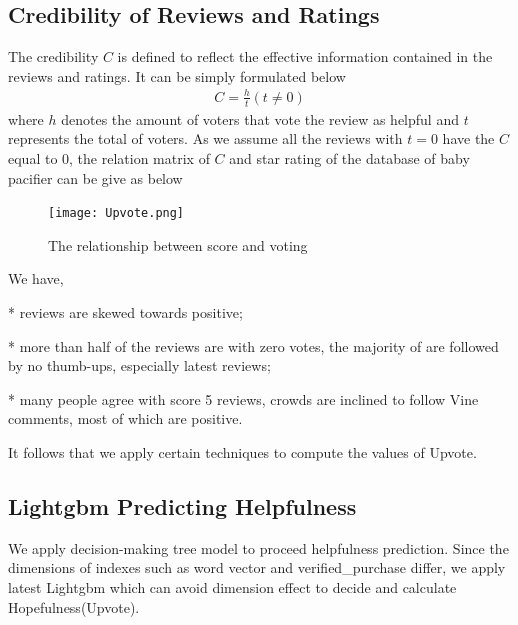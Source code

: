 \documentclass[12pt]{article}%
\begin{document}
\subsection{Credibility of Reviews and Ratings}
The credibility $C$ is defined to reflect the effective information contained in the reviews and ratings. It can be simply formulated below 
\begin{gather}
C=\frac{h}{t} (t\neq 0)
\end{gather}
where $h$ denotes the amount of voters that vote the review as helpful and $t$ represents the total of voters. As we assume all the reviews with $t=0$ have the $C$ equal to $0$, the relation matrix of $C$ and star rating of the database of baby pacifier can be give as below 
\begin{figure}[H]
\centering
\texttt{[image: Upvote.png]}%

\caption{The relationship between score and voting}\label{llssll}%
\end{figure}
We have,

* reviews are skewed towards positive;

* more than half of the reviews are with zero votes, the majority of are followed by no thumb-ups, especially latest reviews;%

* many people agree with score 5 reviews, crowds are inclined to follow Vine comments, most of which are positive.%

It follows that we apply certain techniques to compute the values of Upvote.

\subsection{Lightgbm Predicting Helpfulness}
We apply decision-making tree model to proceed helpfulness prediction. Since the dimensions of indexes such as word vector and verified\_purchase differ, we apply latest Lightgbm\cite{lgb} which can avoid dimension effect to decide and calculate Hopefulness(Upvote).

\end{document}
